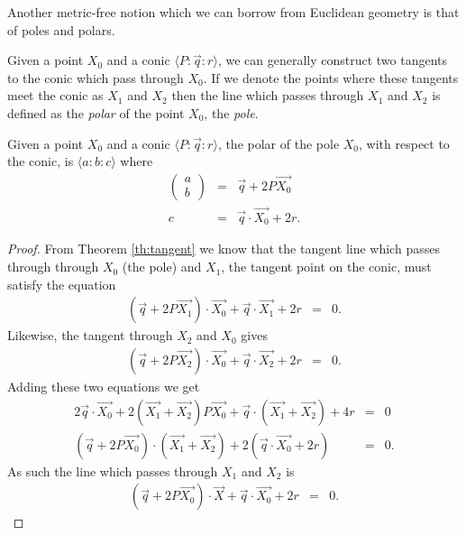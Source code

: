 Another metric-free notion which we can borrow from Euclidean geometry is that of poles and polars.

\begin{definition} Given a point $X_0$ and a conic $\langle P\!:\!\vec{q}\!:\!r \rangle$, we can generally construct two tangents to the conic which pass through $X_0$. If we denote the points where these tangents meet the conic as $X_1$ and $X_2$ then the line which passes through $X_1$ and $X_2$ is defined as the \emph{polar} of the point $X_0$, the \emph{pole}.
\end{definition}

\begin{theorem}\label{th:polar} Given a point $X_0$ and a conic $\langle P\!:\!\vec{q}\!:\!r \rangle$, the polar of the pole $X_0$, with respect to the conic, is $\langle a\!:\!b\!:\!c \rangle$ where
\begin{eqnarray}
\begin{pmatrix}a \\ b\end{pmatrix} & = & \vec{q} + 2P\vec{X_0}\label{eq:polar:ab}\\
c & = & \vec{q}\cdot\vec{X_0} + 2r.\label{eq:polar:c}
\end{eqnarray}
\end{theorem}
\begin{proof}
From Theorem \ref{th:tangent} we know that the tangent line which passes through through $X_0$ (the pole) and $X_1$, the tangent point on the conic, must satisfy the equation
\begin{eqnarray*}
(\vec{q} + 2P\vec{X_1})\cdot \vec{X_0} + \vec{q}\cdot \vec{X_1} + 2r & = & 0.
\end{eqnarray*}
Likewise, the tangent through $X_2$ and $X_0$ gives
\begin{eqnarray*}
(\vec{q} + 2P\vec{X_2})\cdot \vec{X_0} + \vec{q}\cdot \vec{X_2} + 2r & = & 0.
\end{eqnarray*}
Adding these two equations we get
\begin{eqnarray*}
2\vec{q}\cdot\vec{X_0} + 2(\vec{X_1} + \vec{X_2})P\vec{X_0} + \vec{q}\cdot(\vec{X_1} + \vec{X_2}) + 4r & = & 0\\
(\vec{q} + 2P\vec{X_0})\cdot(\vec{X_1} + \vec{X_2}) + 2(\vec{q}\cdot\vec{X_0} + 2r) & = & 0.
\end{eqnarray*}
As such the line which passes through $X_1$ and $X_2$ is
\begin{eqnarray*}
(\vec{q} + 2P\vec{X_0})\cdot \vec{X} + \vec{q}\cdot \vec{X_0} + 2r & = & 0.
\end{eqnarray*}
\end{proof}

